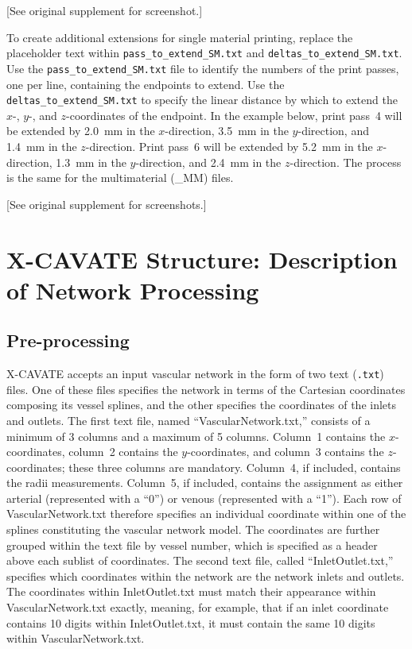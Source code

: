 \documentclass[11pt,letterpaper]{article}
\newcommand{\code}[1]{\texttt{#1}}
\begin{document}
[See original supplement for screenshot.]

To create additional extensions for single material printing, replace the
placeholder text within \code{pass\_to\_extend\_SM.txt} and
\code{deltas\_to\_extend\_SM.txt}. Use the \code{pass\_to\_extend\_SM.txt}
file to identify the numbers of the print passes, one per line, containing the
endpoints to extend. Use the \code{deltas\_to\_extend\_SM.txt} to specify the
linear distance by which to extend the $x$-, $y$-, and $z$-coordinates of the
endpoint. In the example below, print pass~4 will be extended by 2.0~mm in the
$x$-direction, 3.5~mm in the $y$-direction, and 1.4~mm in the $z$-direction.
Print pass~6 will be extended by 5.2~mm in the $x$-direction, 1.3~mm in the
$y$-direction, and 2.4~mm in the $z$-direction. The process is the same for the
multimaterial (\_MM) files.

[See original supplement for screenshots.]

\section{X-CAVATE Structure: Description of Network Processing}
\label{sec:network-processing}


\subsection{Pre-processing}

X-CAVATE accepts an input vascular network in the form of two text (\code{.txt}) files.
One of these files specifies the network in terms of the Cartesian coordinates
composing its vessel splines, and the other specifies the coordinates of the
inlets and outlets. The first text file, named ``VascularNetwork.txt,''
consists of a minimum of 3 columns and a maximum of 5 columns. Column~1
contains the $x$-coordinates, column~2 contains the $y$-coordinates, and
column~3 contains the $z$-coordinates; these three columns are mandatory.
Column~4, if included, contains the radii measurements. Column~5, if included,
contains the assignment as either arterial (represented with a ``0'') or
venous (represented with a ``1''). Each row of VascularNetwork.txt therefore
specifies an individual coordinate within one of the splines constituting the
vascular network model. The coordinates are further grouped within the text
file by vessel number, which is specified as a header above each sublist of
coordinates. The second text file, called ``InletOutlet.txt,'' specifies which
coordinates within the network are the network inlets and outlets. The
coordinates within InletOutlet.txt must match their appearance within
VascularNetwork.txt exactly, meaning, for example, that if an inlet coordinate
contains 10 digits within InletOutlet.txt, it must contain the same 10 digits
within VascularNetwork.txt.
\end{document}
